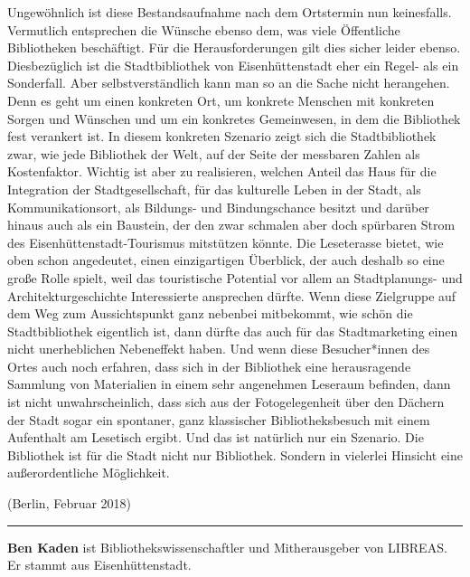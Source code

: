 \documentclass[a4paper,
fontsize=11pt,
oneside,
numbers=noperiodatend,
parskip=half-,
bibliography=totoc,
final
]{scrartcl}
\begin{document}
Ungewöhnlich ist diese Bestandsaufnahme nach dem Ortstermin nun
keinesfalls. Vermutlich entsprechen die Wünsche ebenso dem, was viele
Öffentliche Bibliotheken beschäftigt. Für die Herausforderungen gilt
dies sicher leider ebenso. Diesbezüglich ist die Stadtbibliothek von
Eisenhüttenstadt eher ein Regel- als ein Sonderfall. Aber
selbstverständlich kann man so an die Sache nicht herangehen. Denn es
geht um einen konkreten Ort, um konkrete Menschen mit konkreten Sorgen
und Wünschen und um ein konkretes Gemeinwesen, in dem die Bibliothek
fest verankert ist. In diesem konkreten Szenario zeigt sich die
Stadtbibliothek zwar, wie jede Bibliothek der Welt, auf der Seite der
messbaren Zahlen als Kostenfaktor. Wichtig ist aber zu realisieren,
welchen Anteil das Haus für die Integration der Stadtgesellschaft, für
das kulturelle Leben in der Stadt, als Kommunikationsort, als Bildungs-
und Bindungschance besitzt und darüber hinaus auch als ein Baustein, der
den zwar schmalen aber doch spürbaren Strom des
Eisenhüttenstadt-Tourismus mitstützen könnte. Die Leseterasse bietet,
wie oben schon angedeutet, einen einzigartigen Überblick, der auch
deshalb so eine große Rolle spielt, weil das touristische Potential vor
allem an Stadtplanungs- und Architekturgeschichte Interessierte
ansprechen dürfte. Wenn diese Zielgruppe auf dem Weg zum Aussichtspunkt
ganz nebenbei mitbekommt, wie schön die Stadtbibliothek eigentlich ist,
dann dürfte das auch für das Stadtmarketing einen nicht unerheblichen
Nebeneffekt haben. Und wenn diese Besucher*innen des Ortes auch noch
erfahren, dass sich in der Bibliothek eine herausragende Sammlung von
Materialien in einem sehr angenehmen Leseraum befinden, dann ist nicht
unwahrscheinlich, dass sich aus der Fotogelegenheit über den Dächern der
Stadt sogar ein spontaner, ganz klassischer Bibliotheksbesuch mit einem
Aufenthalt am Lesetisch ergibt. Und das ist natürlich nur ein Szenario.
Die Bibliothek ist für die Stadt nicht nur Bibliothek. Sondern in
vielerlei Hinsicht eine außerordentliche Möglichkeit.

(Berlin, Februar 2018)

\begin{center}\rule{0.5\linewidth}{\linethickness}\end{center}

\textbf{Ben Kaden} ist Bibliothekswissenschaftler und Mitherausgeber von
LIBREAS. Er stammt aus Eisenhüttenstadt.
\end{document}
